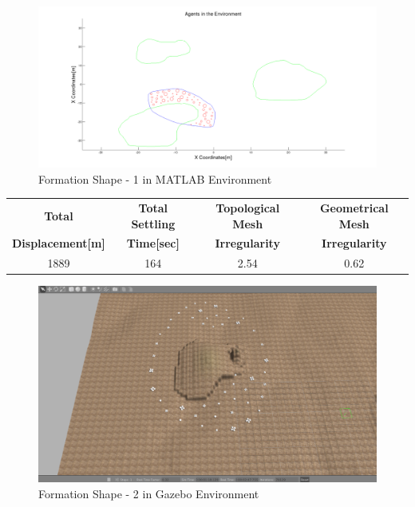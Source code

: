 \begin{figure}[H]
\caption{Formation Shape - 1 in MATLAB Environment}
\centerline{\includegraphics[scale = 0.32]{1}}
\end{figure} 
			
\begin{center}
 \label{perf_shape1} 
\begin{tabular}{||c| c |c |c ||}
					
\hline
\textbf{Total}  & \textbf{Total Settling} & \textbf{Topological Mesh} & \textbf{Geometrical Mesh} \\ \textbf{Displacement[m]} & \textbf{Time[sec]}& \textbf{Irregularity} & \textbf{Irregularity} \\
\hline
1889 & 164 &  2.54& 0.62\\
\hline
\end{tabular}
\end{center}
	
\begin{figure}[H]
\caption{Formation Shape - 2 in Gazebo Environment}
\centerline{\includegraphics[scale = 0.32]{2_Gazebo}}
\end{figure} 
		 
